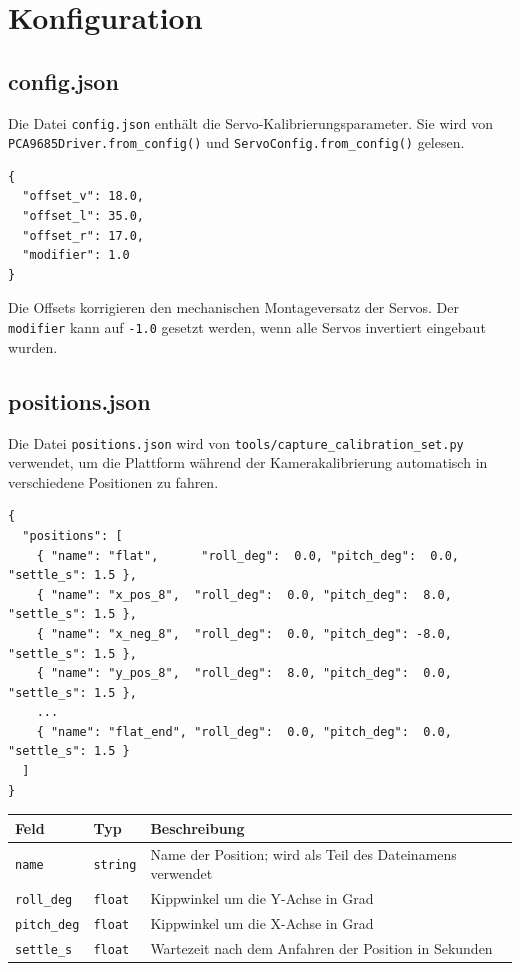 \documentclass[11pt, a4paper]{scrreprt}
\begin{document}
\chapter{Konfiguration}

\section{config.json}

Die Datei \texttt{config.json} enthält die Servo-Kalibrierungsparameter.
Sie wird von \texttt{PCA9685Driver.from\_config()} und
\texttt{ServoConfig.from\_config()} gelesen.

\begin{lstlisting}[language={}]
{
  "offset_v": 18.0,
  "offset_l": 35.0,
  "offset_r": 17.0,
  "modifier": 1.0
}
\end{lstlisting}

Die Offsets korrigieren den mechanischen Montageversatz der Servos.
Der \texttt{modifier} kann auf \texttt{-1.0} gesetzt werden,
wenn alle Servos invertiert eingebaut wurden.

\section{positions.json}

Die Datei \texttt{positions.json} wird von \texttt{tools/capture\_calibration\_set.py}
verwendet, um die Plattform während der Kamerakalibrierung automatisch in
verschiedene Positionen zu fahren.

\begin{lstlisting}[language={}]
{
  "positions": [
    { "name": "flat",      "roll_deg":  0.0, "pitch_deg":  0.0, "settle_s": 1.5 },
    { "name": "x_pos_8",  "roll_deg":  0.0, "pitch_deg":  8.0, "settle_s": 1.5 },
    { "name": "x_neg_8",  "roll_deg":  0.0, "pitch_deg": -8.0, "settle_s": 1.5 },
    { "name": "y_pos_8",  "roll_deg":  8.0, "pitch_deg":  0.0, "settle_s": 1.5 },
    ...
    { "name": "flat_end", "roll_deg":  0.0, "pitch_deg":  0.0, "settle_s": 1.5 }
  ]
}
\end{lstlisting}

\begin{tabularx}{\textwidth}{l l X}
  \toprule
  Feld & Typ & Beschreibung \\
  \midrule
  \texttt{name} & \texttt{string} & Name der Position; wird als Teil des Dateinamens verwendet \\
  \texttt{roll\_deg} & \texttt{float} & Kippwinkel um die Y-Achse in Grad \\
  \texttt{pitch\_deg} & \texttt{float} & Kippwinkel um die X-Achse in Grad \\
  \texttt{settle\_s} & \texttt{float} & Wartezeit nach dem Anfahren der Position in Sekunden \\
  \bottomrule
\end{tabularx}
\end{document}
